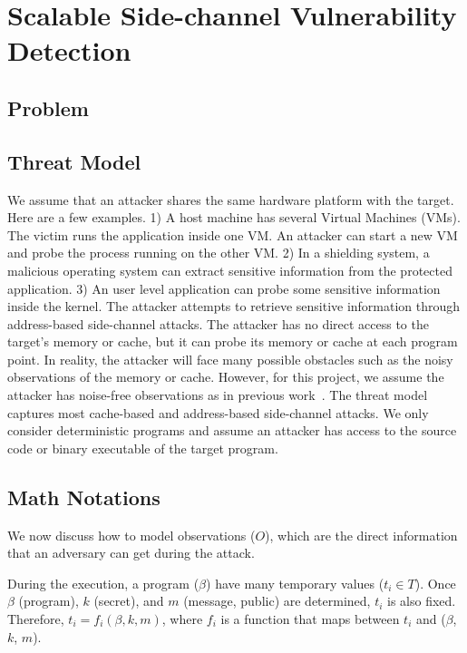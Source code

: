 
\chapter{Scalable Side-channel Vulnerability Detection}\label{chapter3}
\section{Problem}


\section{Threat Model}
We assume that an attacker shares the same hardware platform with the target.
Here are a few examples. 1) A host machine has several Virtual Machines (VMs). The victim runs the application inside one VM. An attacker can start a new VM and probe the process running on the other VM.  2) In a shielding system, a malicious operating system can extract sensitive information from the protected application. 3) An user level application can probe some sensitive information inside the kernel. 
The attacker attempts to retrieve sensitive information through address-based
side-channel attacks. The attacker has no direct access to the target's memory or cache,
but it can probe its memory or cache at each program point. In reality, the
attacker will face many possible obstacles such as the noisy observations 
of the memory or cache. However, for this project, we assume
the attacker has noise-free observations as in previous work~\cite{203878,182946,Brotzman19Casym}. 
The threat model captures most cache-based and address-based side-channel attacks. 
We only consider deterministic programs and assume an attacker 
has access to the source code or binary executable of the target program.


\section{Math Notations}
We now discuss how to model observations ($O$), which are the direct information
that an adversary can get during the attack.

During the execution, a program ($\beta$) have many temporary values ($t_i \in
T$). Once $\beta$ (program), $k$ (secret), and $m$ (message, public) are
determined, $t_i$ is also fixed. Therefore, $ t_i = f_i(\beta, k, m)$, where $f_
i$ is a function that maps between $t_i$ and ($\beta$, $k$, $m$).

